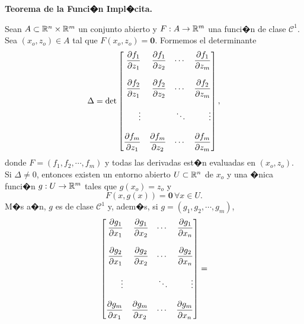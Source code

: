 \documentclass[a4paper]{scrartcl} %
\begin{document}
\begin{theorem}\textbf{Teorema de la Funci�n Impl�cita.} \label{teo:implicit}
\mbox{}

 Sean $A \subset \mathbb{R}^n \times \mathbb{R}^m$ un conjunto abierto y $F: A \to \mathbb{R}^m$ una funci�n de clase $\mathcal{C}^1$. Sea $(x_o,z_o) \in A$ tal que $F(x_o,z_o) = \mathbf{0}$. Formemos el determinante
 \[
  \Delta = \det \begin{bmatrix*}[r]
                \dif{f_1}{z_1} & \dif{f_1}{z_2} & \cdots & \dif{f_1}{z_m} \\
                               &                &        &                \\
                \dif{f_2}{z_1} & \dif{f_2}{z_2} & \cdots & \dif{f_2}{z_m} \\
                               &                &        &                \\
                \vdots         &                & \ddots & \vdots         \\
                               &                &        &                \\
                \dif{f_m}{z_1} & \dif{f_m}{z_2} & \cdots & \dif{f_m}{z_m}
                \end{bmatrix*},
 \]
 donde $F = (f_1, f_2, \cdots , f_m)$ y todas las derivadas est�n evaluadas en $(x_o,z_o)$. Si $\Delta \ne 0$, entonces existen un entorno abierto $U \subset \mathbb{R}^n$ de $x_o$
 y una �nica funci�n $g: U \to \mathbb{R}^m$ tales que $g(x_o) = z_o$ y
 \[
  F(x,g(x)) = \mathbf{0} \, \forall x \in U.
 \]
 M�s a�n, $g$ es de clase $\mathcal{C}^1$ y, adem�s, si $g = (g_1, g_2, \cdots , g_m)$,
 \[
  \begin{bmatrix*}[r]
                \dif{g_1}{x_1} & \dif{g_1}{x_2} & \cdots & \dif{g_1}{x_n} \\
                               &                &        &                \\
                \dif{g_2}{x_1} & \dif{g_2}{x_2} & \cdots & \dif{g_2}{x_n} \\
                               &                &        &                \\
                \vdots         &                & \ddots & \vdots         \\
                               &                &        &                \\
                \dif{g_m}{x_1} & \dif{g_m}{x_2} & \cdots & \dif{g_m}{x_n}
                \end{bmatrix*} =
\]
\end{theorem}
\end{document}
